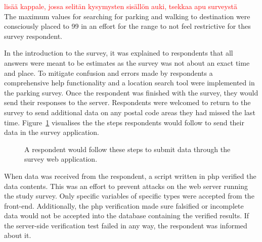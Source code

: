\textcolor{red}{lisää kappale, jossa selitän kysymysten sisällön auki, tsekkaa apu surveystä} \\ 
The maximum values for searching for parking and walking to destination were consciously placed to 99 in an effort for the range to not feel restrictive for thes survey respondent.

In the introduction to the survey, it was explained to respondents that all answers were meant to be estimates as the survey was not about an exact time and place. To mitigate confusion and errors made by respondents a comprehensive help functionality and a location search tool were implemented in the parking survey. Once the respondent was finished with the survey, they would send their responses to the server. Respondents were welcomed to return to the survey to send additional data on any postal code areas they had missed the last time. Figure~\ref{fig:survey_process} visualises the the steps respondents would follow to send their data in the survey application.

\begin{figure}[H]%
    \centering
    \quad
    \quad
    \quad
    \caption[Steps to fill out the survey]{A respondent would follow these steps to submit data through the survey web application.}%
    \label{fig:survey_process}%
\end{figure}

When data was received from the respondent, a script written in \gls{php} verified the data contents. This was an effort to prevent attacks on the web server running the study survey. Only specific variables of specific types were accepted from the front-end. Additionally, the \gls{php} verification made sure falsified or incomplete data would not be accepted into the database containing the verified results. If the server-side verification test failed in any way, the respondent was informed about it. 

